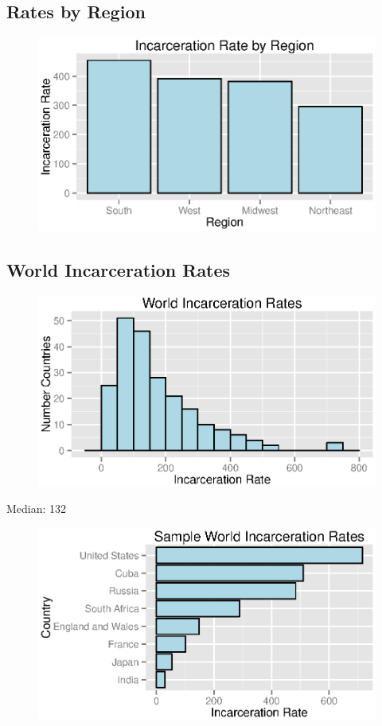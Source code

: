 \documentclass{exam}
\begin{document}
  \subsection{Rates by Region}
  \begin{figure}[H]
    \centering
    \includegraphics[scale = 0.9]{rate_by_region.eps}
  \end{figure}

  \subsection{World Incarceration Rates}
  \begin{figure}[H]
    \centering
    \includegraphics[scale = 0.9]{world_rate_histogram.eps}
  \end{figure}

  Median: 132

  \begin{figure}[H]
    \centering
    \includegraphics[scale = 0.9]{world_rates.eps}
  \end{figure}
\end{document}
